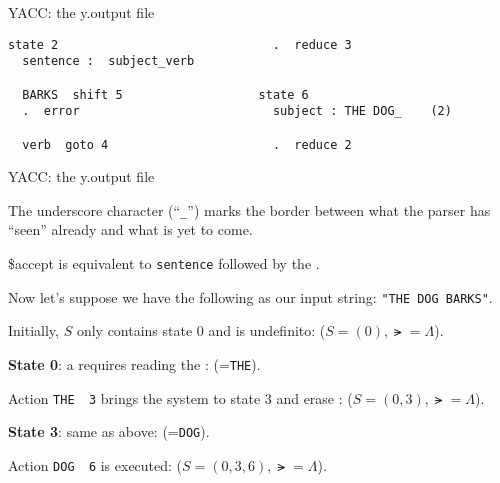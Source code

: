 \begin{frame}[fragile]{YACC: the y.output file}
\begin{verbatim}
state 2                              .  reduce 3
  sentence :  subject_verb 

  BARKS  shift 5                   state 6
  .  error                           subject : THE DOG_    (2)

  verb  goto 4                       .  reduce 2
\end{verbatim}



\end{frame}
\begin{frame}[fragile]{YACC: the y.output file}

The underscore character 
(``\verb"_"'') marks the border between what the parser
has ``seen'' already and what is yet to come.


\vspace{20pt}

\$accept is equivalent to {\tt sentence} followed by the
\endmarker.


\vspace{20pt}

Now let's suppose we have the following as our input string: {\tt "THE DOG BARKS"}.


\vspace{20pt}

Initially, $S$ only contains state 0
and \lat{} is undefinito:
($S=(0), \lat=\Lambda$).


\vspace{20pt}

{\bf State 0}: a \shift{} requires reading the
\lat:  (\lat={\tt THE}).


\vspace{20pt}

Action {\tt THE \shift\ 3} brings the system to state 3 and
erase \lat: ($S=(0,3), \lat=\Lambda$).


\vspace{20pt}

{\bf State 3}: same as above:
(\lat={\tt DOG}).


\vspace{20pt}

Action
{\tt DOG \shift\ 6} is executed:
($S=(0,3,6), \lat=\Lambda$).

\end{frame}
